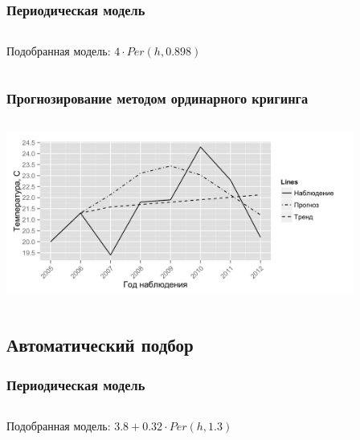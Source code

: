 \documentclass[10pt, ucs, pdf,aspectratio=169]{beamer}
\begin{document}
\begin{frame}
  \frametitle{Периодическая модель}   %
  \begin{columns}[c]
  \column{2in}  %
  Подобранная модель: $ 4 \cdot Per(h, 0.898) $
  \column{3in}
  \end{columns}
\end{frame}

\begin{frame}
  \frametitle{Прогнозирование методом ординарного кригинга}   %
   \begin{columns}[c]
   \column{4.5in}
   \includegraphics[width=4.5in]{../../figures/variogram/per-fit-cv-cross-prediction.png}
  \end{columns}
\end{frame}

\subsection{Автоматический подбор}

\begin{frame}
  \frametitle{Периодическая модель}   %
  \begin{columns}[c]
  \column{2in}  %
  Подобранная модель: $ 3.8 + 0.32 \cdot Per(h, 1.3) $
  \column{3in}
  \end{columns}
\end{frame}
\end{document}
